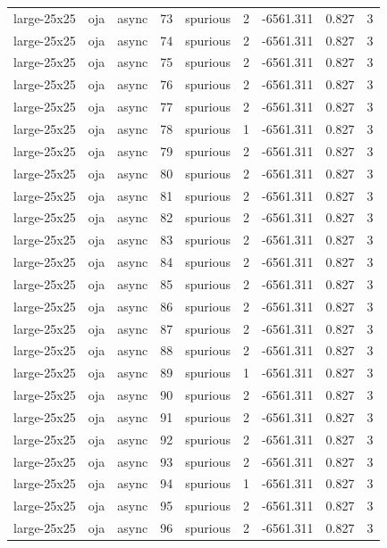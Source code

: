 \begin{tabular}{lllrlrrrr}
large-25x25 & oja & async & 73 & spurious & 2 & -6561.311 & 0.827 & 3 \\
large-25x25 & oja & async & 74 & spurious & 2 & -6561.311 & 0.827 & 3 \\
large-25x25 & oja & async & 75 & spurious & 2 & -6561.311 & 0.827 & 3 \\
large-25x25 & oja & async & 76 & spurious & 2 & -6561.311 & 0.827 & 3 \\
large-25x25 & oja & async & 77 & spurious & 2 & -6561.311 & 0.827 & 3 \\
large-25x25 & oja & async & 78 & spurious & 1 & -6561.311 & 0.827 & 3 \\
large-25x25 & oja & async & 79 & spurious & 2 & -6561.311 & 0.827 & 3 \\
large-25x25 & oja & async & 80 & spurious & 2 & -6561.311 & 0.827 & 3 \\
large-25x25 & oja & async & 81 & spurious & 2 & -6561.311 & 0.827 & 3 \\
large-25x25 & oja & async & 82 & spurious & 2 & -6561.311 & 0.827 & 3 \\
large-25x25 & oja & async & 83 & spurious & 2 & -6561.311 & 0.827 & 3 \\
large-25x25 & oja & async & 84 & spurious & 2 & -6561.311 & 0.827 & 3 \\
large-25x25 & oja & async & 85 & spurious & 2 & -6561.311 & 0.827 & 3 \\
large-25x25 & oja & async & 86 & spurious & 2 & -6561.311 & 0.827 & 3 \\
large-25x25 & oja & async & 87 & spurious & 2 & -6561.311 & 0.827 & 3 \\
large-25x25 & oja & async & 88 & spurious & 2 & -6561.311 & 0.827 & 3 \\
large-25x25 & oja & async & 89 & spurious & 1 & -6561.311 & 0.827 & 3 \\
large-25x25 & oja & async & 90 & spurious & 2 & -6561.311 & 0.827 & 3 \\
large-25x25 & oja & async & 91 & spurious & 2 & -6561.311 & 0.827 & 3 \\
large-25x25 & oja & async & 92 & spurious & 2 & -6561.311 & 0.827 & 3 \\
large-25x25 & oja & async & 93 & spurious & 2 & -6561.311 & 0.827 & 3 \\
large-25x25 & oja & async & 94 & spurious & 1 & -6561.311 & 0.827 & 3 \\
large-25x25 & oja & async & 95 & spurious & 2 & -6561.311 & 0.827 & 3 \\
large-25x25 & oja & async & 96 & spurious & 2 & -6561.311 & 0.827 & 3 \\

\end{tabular}
